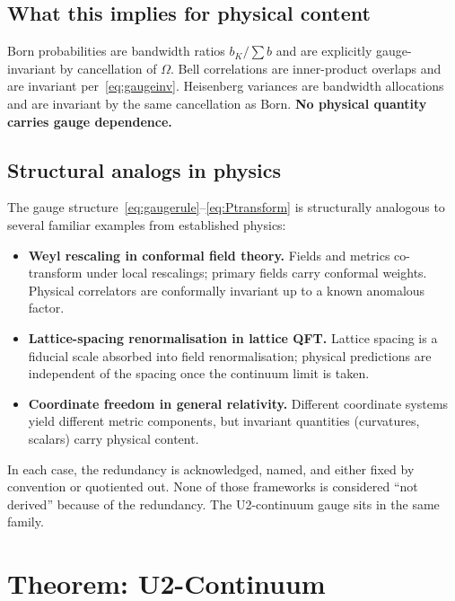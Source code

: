 \documentclass[11pt,a4paper]{article}
\begin{document}
\subsection{What this implies for physical content}

Born probabilities are bandwidth ratios $b_K / \sum b$ and are explicitly gauge-invariant by cancellation of $\Omega$. Bell correlations are inner-product overlaps and are invariant per~\eqref{eq:gaugeinv}. Heisenberg variances are bandwidth allocations and are invariant by the same cancellation as Born. \textbf{No physical quantity carries gauge dependence.}

\subsection{Structural analogs in physics}

The gauge structure~\eqref{eq:gaugerule}--\eqref{eq:Ptransform} is structurally analogous to several familiar examples from established physics:

\begin{itemize}
  \item \textbf{Weyl rescaling in conformal field theory.} Fields and metrics co-transform under local rescalings; primary fields carry conformal weights. Physical correlators are conformally invariant up to a known anomalous factor.
  \item \textbf{Lattice-spacing renormalisation in lattice QFT.} Lattice spacing is a fiducial scale absorbed into field renormalisation; physical predictions are independent of the spacing once the continuum limit is taken.
  \item \textbf{Coordinate freedom in general relativity.} Different coordinate systems yield different metric components, but invariant quantities (curvatures, scalars) carry physical content.
\end{itemize}

In each case, the redundancy is acknowledged, named, and either fixed by convention or quotiented out. None of those frameworks is considered ``not derived'' because of the redundancy. The U2-continuum gauge sits in the same family.

\section{Theorem: U2-Continuum}\label{sec:thmcontinuum}
\end{document}
